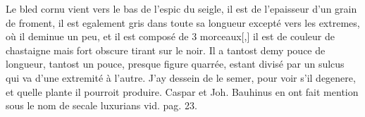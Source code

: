 \pend
\newpage
\pstart 
Le bled cornu vient vers le bas de l'espic du seigle, il est de l'epaisseur d'un grain de froment, il est egalement gris dans toute sa longueur except\'{e} vers les extremes, o\`{u} il deminue un peu, et il est compos\'{e} de 3 morceaux[,] il est de couleur de chastaigne mais fort obscure tirant sur le noir. Il a tantost demy pouce de longueur, tantost un pouce, presque figure quarr\'{e}e, estant divis\'{e} par un sulcus qui va d'une extremit\'{e} \`{a} l'autre. J'ay dessein de le semer, pour voir s'il degenere, et quelle plante il pourroit produire. Caspar\protect{} et Joh. Bauhinus\protect{} en ont fait mention sous le nom de secale luxurians\protect{} vid. pag. 23.
%
